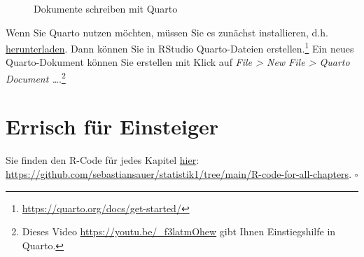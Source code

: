 \documentclass[
  a4paper,
]{scrbook}
\theoremstyle{definition}
\theoremstyle{definition}
\theoremstyle{definition}
\theoremstyle{remark}
\begin{document}
\begin{figure}


\caption{\label{fig-exm-quarto}Dokumente schreiben mit Quarto}

\end{figure}%

Wenn Sie Quarto nutzen möchten, müssen Sie es zunächst installieren,
d.h. \href{https://quarto.org/docs/get-started/}{herunterladen}. Dann
können Sie in RStudio Quarto-Dateien erstellen.\footnote{\url{https://quarto.org/docs/get-started/}}
Ein neues Quarto-Dokument können Sie erstellen mit Klick auf \emph{File
\textgreater{} New File \textgreater{} Quarto Document
\ldots{}}.\footnote{Dieses Video \url{https://youtu.be/_f3latmOhew} gibt
  Ihnen Einstiegshilfe in Quarto.}

\section{Errisch für Einsteiger}\label{errisch-fuxfcr-einsteiger}

\begin{tcolorbox}[enhanced jigsaw, colbacktitle=quarto-callout-note-color!10!white, bottomrule=.15mm, left=2mm, breakable, rightrule=.15mm, coltitle=black, title=\textcolor{quarto-callout-note-color}{\faInfo}\hspace{0.5em}{Hinweis}, colback=white, leftrule=.75mm, titlerule=0mm, opacityback=0, bottomtitle=1mm, toprule=.15mm, arc=.35mm, toptitle=1mm, opacitybacktitle=0.6, colframe=quarto-callout-note-color-frame]

Sie finden den R-Code für jedes Kapitel
\href{https://github.com/sebastiansauer/statistik1/tree/main/R-code-for-all-chapters}{hier}:
\url{https://github.com/sebastiansauer/statistik1/tree/main/R-code-for-all-chapters}.
\(\square\)

\end{tcolorbox}
\end{document}
